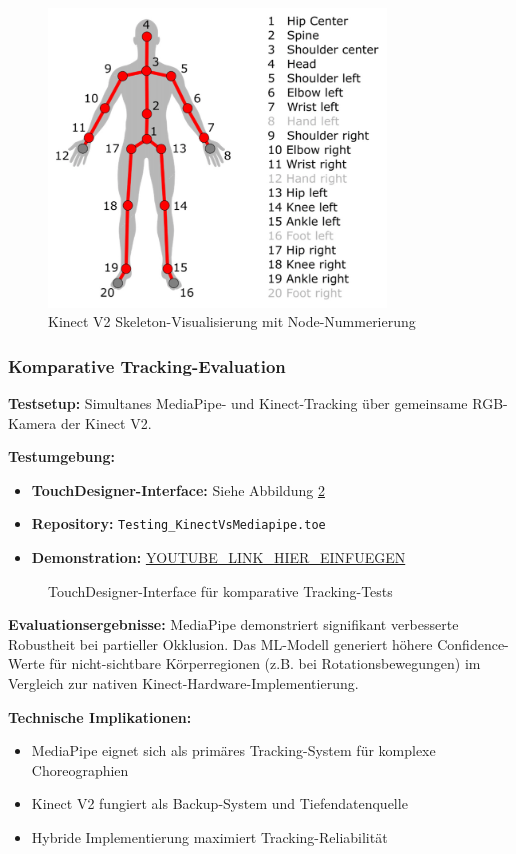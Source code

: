 \begin{figure}[H]
    \centering
    \includegraphics[width=0.8\textwidth]{images/kinect_nodes.png}
    \caption{Kinect V2 Skeleton-Visualisierung mit Node-Nummerierung}
    \label{fig:kinect_nodes}
\end{figure}

\subsubsection{Komparative Tracking-Evaluation}

\textbf{Testsetup:}
Simultanes MediaPipe- und Kinect-Tracking über gemeinsame RGB-Kamera der Kinect V2.

\textbf{Testumgebung:}
\begin{itemize}
    \item \textbf{TouchDesigner-Interface:} Siehe Abbildung \ref{fig:testing_interface}
    \item \textbf{Repository:} \texttt{Testing\_KinectVsMediapipe.toe}
    \item \textbf{Demonstration:} \url{YOUTUBE_LINK_HIER_EINFUEGEN}
\end{itemize}

\begin{figure}[H]
    \centering
    \caption{TouchDesigner-Interface für komparative Tracking-Tests}
    \label{fig:testing_interface}
\end{figure}

\textbf{Evaluationsergebnisse:}
MediaPipe demonstriert signifikant verbesserte Robustheit bei partieller Okklusion. Das ML-Modell generiert höhere Confidence-Werte für nicht-sichtbare Körperregionen (z.B. bei Rotationsbewegungen) im Vergleich zur nativen Kinect-Hardware-Implementierung.

\textbf{Technische Implikationen:}
\begin{itemize}
    \item MediaPipe eignet sich als primäres Tracking-System für komplexe Choreographien
    \item Kinect V2 fungiert als Backup-System und Tiefendatenquelle
    \item Hybride Implementierung maximiert Tracking-Reliabilität
\end{itemize}